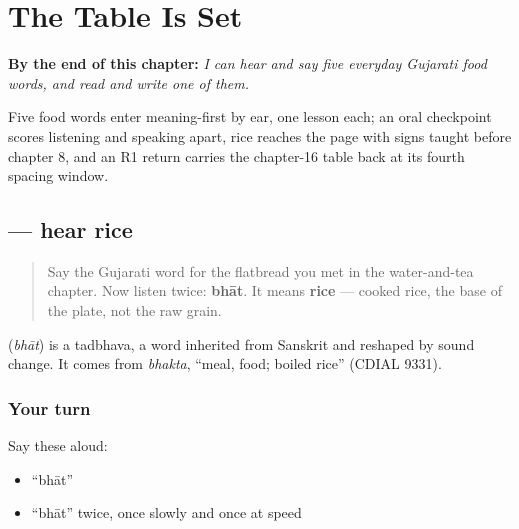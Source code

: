 
\chapter{The Table Is Set}
\label{ch:gu-table-is-set}

\begin{chapteropening}
\textbf{By the end of this chapter:} \emph{I can hear and say five everyday Gujarati food words, and read and write one of them.}

Five food words enter meaning-first by ear, one lesson each; an oral checkpoint scores listening and speaking apart, rice reaches the page with signs taught before chapter 8, and an R1 return carries the chapter-16 table back at its fourth spacing window.
\end{chapteropening}

\section[\texorpdfstring{\gu{ભાત} (bhāt)}{ભાત (bhāt)}]{ — hear rice}

\label{lesson:GU-C27-hear-bhaat}



\begin{quote}
Say the Gujarati word for the flatbread you met in the water-and-tea chapter. Now listen twice: \textbf{bhāt}. It means \textbf{rice} — cooked rice, the base of the plate, not the raw grain.
\end{quote}

\begin{cousinweb}
\textbf{} (\emph{bhāt}) is a tadbhava, a word inherited from Sanskrit and reshaped by sound change. It comes from \emph{bhakta}, \textquotedblleft{}meal, food; boiled rice\textquotedblright{} (CDIAL 9331).
\end{cousinweb}

\subsection*{Your turn}
Say these aloud:

\begin{itemize}
\raggedright
  \item \textquotedblleft{}bhāt\textquotedblright{}
  \item \textquotedblleft{}bhāt\textquotedblright{} twice, once slowly and once at speed
\end{itemize}

